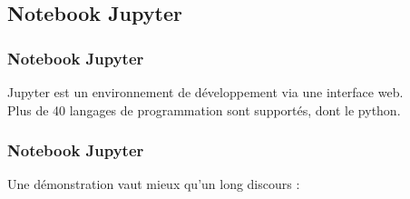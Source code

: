 \subsection{Notebook Jupyter}

\begin{frame}
  \frametitle{Notebook Jupyter}
  Jupyter est un environnement de développement via une interface web. \\
  Plus de 40 langages de programmation sont supportés, dont le python. \\
\end{frame}

\begin{frame}
  \frametitle{Notebook Jupyter}
  Une démonstration vaut mieux qu'un long discours : \\
\end{frame}

